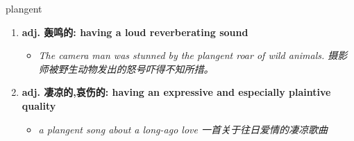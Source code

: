 
\begin{frame}
{\huge plangent}
\begin{center}
\begin{enumerate}\Large
  \item \textbf{adj. 轰鸣的: having a loud reverberating sound}
  \begin{itemize}
    \item \em{\Large{The camera man was stunned by the plangent roar of wild animals. 摄影师被野生动物发出的怒号吓得不知所措。}}
  \end{itemize}
  \item \textbf{adj. 凄凉的,哀伤的: having an expressive and especially plaintive quality}
  \begin{itemize}
    \item \em{\Large{a plangent song about a long-ago love 一首关于往日爱情的凄凉歌曲}}
  \end{itemize}
\end{enumerate}
\end{center}
\end{frame}
